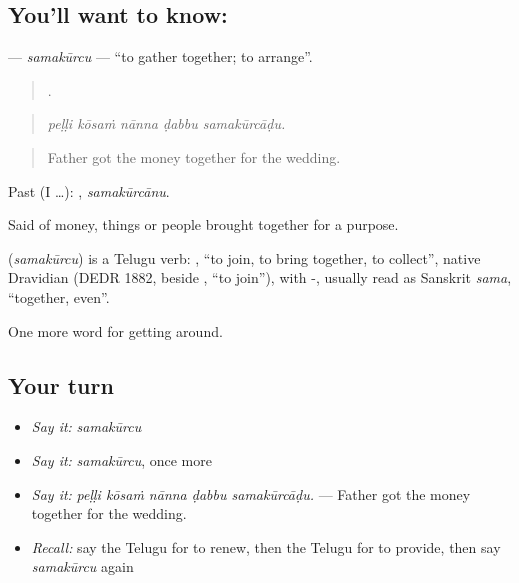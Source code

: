 \subsection*{You'll want to know: }
\textbf{} — \emph{samakūrcu} — \textquotedblleft{}to gather together; to arrange\textquotedblright{}.

\begin{quote}
    .
\end{quote}

\begin{quote}
\emph{peḷḷi kōsaṁ nānna ḍabbu samakūrcāḍu.}
\end{quote}

\begin{quote}
Father got the money together for the wedding.
\end{quote}

Past (I …): , \emph{samakūrcānu}.

Said of money, things or people brought together for a purpose.

\begin{cousinweb}
\textbf{} (\emph{samakūrcu}) is a Telugu verb: , \textquotedblleft{}to join, to bring together, to collect\textquotedblright{}, native Dravidian (DEDR 1882, beside , \textquotedblleft{}to join\textquotedblright{}), with -, usually read as Sanskrit \emph{sama}, \textquotedblleft{}together, even\textquotedblright{}.
\end{cousinweb}

\begin{grammarlens}[title={What you've built}]
One more word for getting around.
\end{grammarlens}

\subsection*{Your turn}
\begin{itemize}
\raggedright
  \item \emph{Say it:} \emph{samakūrcu}
  \item \emph{Say it:} \emph{samakūrcu}, once more
  \item \emph{Say it:} \emph{peḷḷi kōsaṁ nānna ḍabbu samakūrcāḍu.} — Father got the money together for the wedding.
  \item \emph{Recall:} say the Telugu for to renew, then the Telugu for to provide, then say \emph{samakūrcu} again
\end{itemize}


